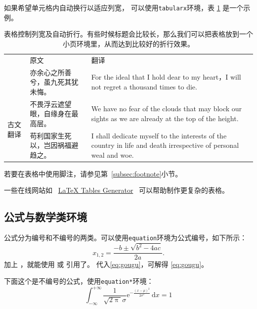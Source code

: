 如果希望单元格内自动换行以适应列宽，
可以使用\texttt{tabularx}环境，表 \ref{tab:tabularx} 是一个示例。
\begin{table}[htbp]
	\centering
	\begin{minipage}{0.9\textwidth}
		\caption{表格控制列宽及自动折行。有些时候标题会比较长，那么我们可以把表格放到一个小页环境里，从而达到比较好的折行效果。}
		\label{tab:tabularx}
		\begin{tabularx}{\textwidth}{p{4em}p{7.5em}X}
			\toprule
									& \multicolumn{1}{l}{原文}         & \multicolumn{1}{l}{翻译}                                                                                         \\
			\cmidrule(l){2-3}
									& 亦余心之所善兮，虽九死其犹未悔。 & For the ideal that I hold dear to my heart，I will not regret a thousand times to die.                           \\
			\cmidrule(l){2-3}
			\multirow{3}{*}{古文翻译} & 不畏浮云遮望眼，自缘身在最高层。 & We have no fear of the clouds that may block our sights as we are already at the top of the height.              \\
			\cmidrule(l){2-3}
									& 苟利国家生死以，岂因祸福避趋之。 & I shall dedicate myself to the interests of the country in life and death irrespective of personal weal and woe. \\
			\bottomrule
		\end{tabularx}
	\end{minipage}
\end{table}

若要在表格中使用脚注，请参见第~\ref{subsec:footnote}小节。

一些在线网站如
~\href{http://www.tablesgenerator.com}{LaTeX Tables Generator}~
可以帮助制作更复杂的表格。


\subsection{公式与数学类环境}\label{subsec:eqandmath}
公式分为编号和不编号的两类。可以使用\texttt{equation}环境为公式编号，如下所示：
\begin{equation}\label{eq:gougu}
	x_{1,2}=\frac{{-b \pm \sqrt{{b^2}-4ac}}}{{2a}}.
\end{equation}
加上 ，就能使用 或 引用了。
代入\ref{eq:gougu}，可解得 \eqref{eq:gougu}。

下面这个是不编号的公式，使用\texttt{equation*}环境：
\begin{equation*}
	\int_{-\infty}^{+\infty}\frac{1}{\sqrt{2\uppi}\sigma}
	\mathrm{e}^{-\tfrac{(x-\mu)^2}{2\sigma^2}} \,\mathrm{d}x =1
\end{equation*}

